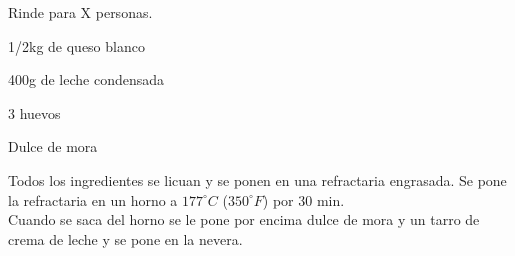 
Rinde para X personas.

\begin{ingredientes}
\item 1/2kg de queso blanco
\item 400g de leche condensada
\item 3 huevos
\item Dulce de mora
\end{ingredientes}
\preparacion
Todos los ingredientes se licuan y se ponen en una refractaria engrasada. Se pone la refractaria en un horno a $177^{\circ}C$ ($350^{\circ}F$) por 30 min.\\

Cuando se saca del horno se le pone por encima dulce de mora y un tarro de crema de leche y se pone en la nevera.